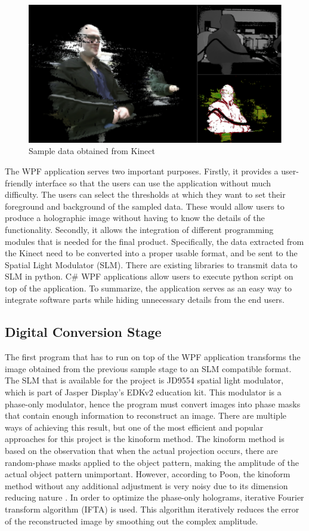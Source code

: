 \documentclass[12pt]{article}
\begin{document}
\begin{figure}
    \centering
    \includegraphics[width=\textwidth]{kinectsample}
    \caption{Sample data obtained from Kinect}
    \label{fig:kinect}
\end{figure}

The WPF application serves two important purposes. Firstly, it provides a user-friendly interface so that the users can use the application without much difficulty. The users can select the thresholds at which they want to set their foreground and background of the sampled data. These would allow users to produce a holographic image without having to know the details of the functionality. Secondly, it allows the integration of different programming modules that is needed for the final product. Specifically, the data extracted from the Kinect need to be converted into a proper usable format, and be sent to the Spatial Light Modulator (SLM). There are existing libraries to transmit data to SLM in python. C\# WPF applications allow users to execute python script on top of the application. To summarize, the application serves as an easy way to integrate software parts while hiding unnecessary details from the end users.

\subsection{Digital Conversion Stage}

The first program that has to run on top of the WPF application transforms the image obtained from the previous sample stage to an SLM compatible format. The SLM that is available for the project is JD9554 spatial light modulator, which is part of Jasper Display's EDKv2 education kit. This modulator is a phase-only modulator, hence the program must convert images into phase masks that contain enough information to reconstruct an image. There are multiple ways of achieving this result, but one of the most efficient and popular approaches for this project is the kinoform method. The kinoform method is based on the observation that when the actual projection occurs, there are random-phase masks applied to the object pattern, making the amplitude of the actual object pattern unimportant. However, according to Poon, the kinoform method without any additional adjustment is very noisy due to its dimension reducing nature \cite{Poon14}. In order to optimize the phase-only holograms, iterative Fourier transform algorithm (IFTA) is used. This algorithm iteratively reduces the error of the reconstructed image by smoothing out the complex amplitude.
\end{document}
